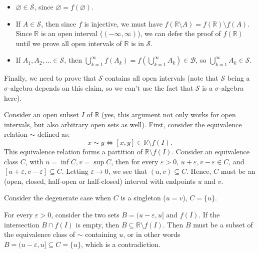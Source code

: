 \begin{enumerate}[label=\textbf{2B.\arabic*}]
  \begin{itemize}
  \item \( \varnothing \in \mathcal{S} \), since \( \varnothing = f(\varnothing)
    \).
  \item If \( A \in \mathcal{S} \), then since \( f \) is injective, we must
    have \( f(\mathbb{R} \setminus A) = f(\mathbb{R}) \setminus f(A) \). Since
    \( \mathbb{R} \) is an open interval (\( (-\infty, \infty) \)), we can defer
    the proof of \( f(\mathbb{R}) \) until we prove all open intervals of \(
    \mathbb{R} \) is in \( \mathcal{S} \).
  \item If \( A_{1}, A_{2}, \ldots \in \mathcal{S} \), then \( \bigcup_{k =
    1}^{\infty} f(A_{k}) = f \left( \bigcup_{k = 1}^{\infty} A_{k} \right) \in
    \mathcal{B}  \), so \( \bigcup_{k = 1}^{\infty} A_{k} \in \mathcal{S} \).
  \end{itemize}

  Finally, we need to prove that \( \mathcal{S} \) contains all open intervals (note
  that \( \mathcal{S} \) being a \( \sigma \)-algebra depends on this claim, so
  we can't use the fact that \( \mathcal{S} \) is a \( \sigma \)-algebra here).

  Consider an open subset \( I \) of \( \mathbb{R} \) (yes, this argument not
  only works for open intervals, but also arbitrary open sets as well).
  First, consider the equivalence relation \( \sim  \)
  defined as:
  \[
    x \sim y \iff [x, y] \in \mathbb{R} \setminus f(I)
  .\] 
  This equivalence relation forms a partition of \( \mathbb{R} \setminus f(I)
  \). Consider an equivalence class \( C \), with \( u = \inf C, v = \sup C \),
  then for every \( \varepsilon > 0 \), \( u +\varepsilon, v - \varepsilon \in C
  \), and \( [u+\varepsilon, v - \varepsilon] \subseteq C \). Letting \(
  \varepsilon \to 0 \), we see that \( (u, v) \subseteq C \). Hence, \( C \)
  must be an (open, closed, half-open or half-closed) interval with endpoints \(
  u \) and \( v \).
  
  Consider the degenerate case when \( C \) is a singleton (\( u = v \)), \( C =
  \{u\}  \).

  For every \( \varepsilon > 0 \), consider the two sets \( B = (u - \varepsilon,
  u] \) and \( f(I) \). If the intersection \( B \cap f(I) \) is empty, then \(
  B \subseteq \mathbb{R} \setminus f(I)\). Then \( B \) must be a subset of the
  equivalence class of \( \sim  \) containing \( u \), or in other words \( B =
  (u - \varepsilon, u] \subseteq C = \{u\}  \), which is a contradiction.


\end{enumerate}
